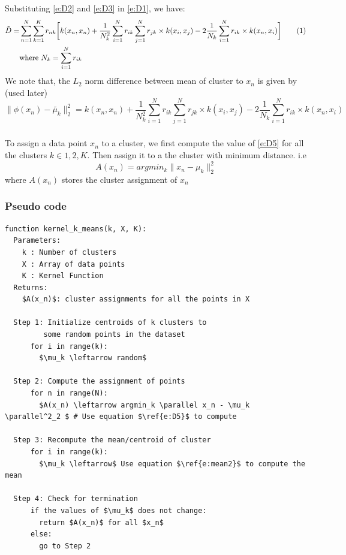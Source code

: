 \documentclass[a4paper,doc,notimes]{article}
\newcommand\numberthis{\addtocounter{equation}{1}\tag{\theequation}}
\begin{document}
Substituting \ref{e:D2} and \ref{e:D3} in \ref{e:D1}, we have:
\begin{align*}
\tilde{D} =& \sum_{n=1}^{N} \sum_{k=1}^{K} r_{nk} \bigg[k(x_n, x_n) +  \frac{1}{N_k^2} \sum_{i=1}^{N} r_{ik} \sum_{j=1}^{N} r_{jk} \times k(x_i, x_j) - 2 \frac{1}{N_k} \sum_{i=1}^{N} r_{ik} \times k(x_n, x_i) \bigg] \numberthis \label{e:D4} \\
& \text{where } N_k = \sum_{i=1}^{N} r_{ik}
\end{align*}
We note that, the $L_2$ norm difference between mean of cluster to $x_n$ is given by (used later)
\begin{equation} \label{e:D5}
 \parallel\phi(x_n) - \tilde{\mu_k} \parallel_2^2 = k(x_n, x_n) +  \frac{1}{N_k^2} \sum_{i=1}^{N} r_{ik} \sum_{j=1}^{N} r_{jk} \times k(x_i, x_j) - 2 \frac{1}{N_k} \sum_{i=1}^{N} r_{ik} \times k(x_n, x_i)
\end{equation}

\subsubsection{}
To assign a data point $x_n$ to a cluster, we first compute the value of \ref{e:D5} for all the clusters $k \in 1, 2, K$. Then assign it to a the cluster with minimum distance. i.e
\begin{equation}\label{e:asgn}
	A(x_n) = argmin_k \parallel x_n - \mu_k \parallel^2_2 
\end{equation}
where $A(x_n)$ stores the cluster assignment of $x_n$

\subsubsection{Pseudo code}
\begin{lstlisting}[mathescape=true]
function kernel_k_means(k, X, K):
  Parameters:
    k : Number of clusters
    X : Array of data points
    K : Kernel Function
  Returns:
    $A(x_n)$: cluster assignments for all the points in X

  Step 1: Initialize centroids of k clusters to
         some random points in the dataset
      for i in range(k):
        $\mu_k \leftarrow random$

  Step 2: Compute the assignment of points
      for n in range(N):
        $A(x_n) \leftarrow argmin_k \parallel x_n - \mu_k \parallel^2_2 $ # Use equation $\ref{e:D5}$ to compute

  Step 3: Recompute the mean/centroid of cluster
      for i in range(k):
        $\mu_k \leftarrow$ Use equation $\ref{e:mean2}$ to compute the mean
  
  Step 4: Check for termination
      if the values of $\mu_k$ does not change:
        return $A(x_n)$ for all $x_n$
      else:
        go to Step 2
\end{lstlisting}
\end{document}
